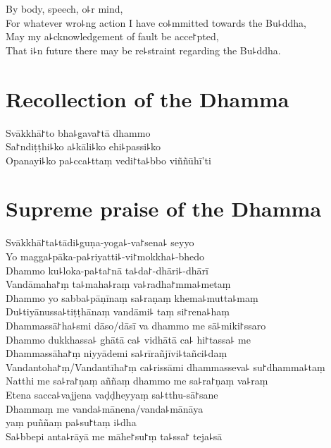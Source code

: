 By body, speech, o꜕r mind,\\
For whatever wro꜕ng action I have co꜕mmitted towards the Bu꜕ddha,\\
May my a꜕cknowledgement of fault be acce꜓pted,\\
That i꜕n future there may be re꜕straint regarding the Bu꜕ddha.

\clearpage

\chapter{Recollection of the Dhamma}%

\begin{leader}
\end{leader}

Svākkhā꜓to bha꜕gava꜓tā dhammo\\
Sa꜓ndiṭṭhi꜕ko a꜕kāli꜕ko ehi꜕passi꜕ko\\
Opanayi꜕ko pa꜕cca꜕ttaṃ vedi꜓ta꜕bbo viññūhī'ti


\chapter{Supreme praise of the Dhamma}%

\begin{leader}
\end{leader}

Svākkhā꜓ta꜕tādi꜕guṇa-yoga꜕-va꜓sena꜕ seyyo\\
Yo magga꜕pāka-pa꜕riyatti꜕-vi꜓mokkha꜕-bhedo\\
Dhammo ku꜕loka-pa꜕ta꜓nā ta꜕da꜓-dhāri꜕-dhārī\\
Vandāmaha꜓ṃ ta꜕maha꜕raṃ va꜕radha꜓mma꜕metaṃ\\
Dhammo yo sabba꜕pāṇīnaṃ sa꜕raṇaṃ khema꜕mutta꜕maṃ\\
Du꜕tiyānussa꜕tiṭṭhānaṃ vandāmi꜕ taṃ si꜓rena꜕haṃ\\
Dhammassā꜓ha꜕smi dāso/dāsī va dhammo me sā꜕miki꜓ssaro\\
Dhammo dukkhassa꜕ ghātā ca꜕ vidhātā ca꜕ hi꜓tassa꜕ me\\
Dhammassāha꜓ṃ niyyādemi sa꜕rīrañjīvi꜕tañci꜕daṃ\\
Vandantoha꜓ṃ/Vandantīha꜓ṃ ca꜕rissāmi dhammasseva꜕ su꜓dhamma꜕taṃ\\
Natthi me sa꜕ra꜓ṇaṃ aññaṃ dhammo me sa꜕ra꜓ṇaṃ va꜕raṃ\\
Etena sacca꜕vajjena vaḍḍheyyaṃ sa꜕tthu-sā꜓sane\\
Dhammaṃ me vanda꜕mānena/vanda꜕mānāya\\
\vin yaṃ puññaṃ pa꜕su꜓taṃ i꜕dha\\
Sa꜕bbepi anta꜕rāyā me māhe꜓su꜓ṃ ta꜕ssa꜓ teja꜕sā

